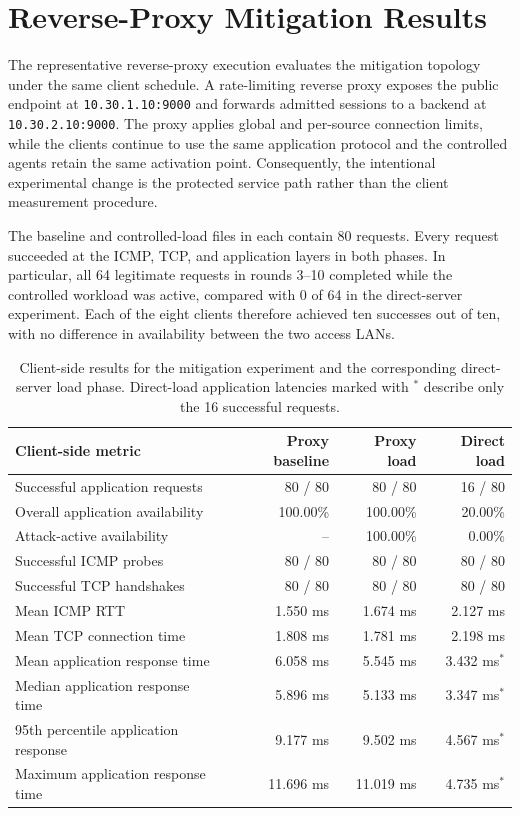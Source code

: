 \section{Reverse-Proxy Mitigation Results}
\label{sec:mitigation-results}

The representative reverse-proxy execution evaluates the mitigation topology
under the same client schedule. A rate-limiting reverse proxy exposes the public endpoint
at \texttt{10.30.1.10:9000} and forwards admitted sessions to a backend at
\texttt{10.30.2.10:9000}. The proxy applies global and per-source connection
limits, while the clients continue to use the same application protocol and
the controlled agents retain the same activation point. Consequently, the
intentional experimental change is the protected service path rather than the
client measurement procedure.

The baseline and controlled-load files in
 each contain 80 requests. Every request
succeeded at the ICMP, TCP, and application layers in both phases. In
particular, all 64 legitimate requests in rounds 3--10 completed while the
controlled workload was active, compared with 0 of 64 in the direct-server
experiment. Each of the eight clients therefore achieved ten successes out of
ten, with no difference in availability between the two access LANs.

\begin{table}[htbp]
\centering
\small
\setlength{\tabcolsep}{4pt}
\begin{tabular}{lrrr}
\toprule
\textbf{Client-side metric} & \textbf{Proxy baseline} & \textbf{Proxy load} & \textbf{Direct load} \\
\midrule
Successful application requests & 80 / 80 & 80 / 80 & 16 / 80 \\
Overall application availability & 100.00\% & 100.00\% & 20.00\% \\
Attack-active availability & -- & 100.00\% & 0.00\% \\
Successful ICMP probes & 80 / 80 & 80 / 80 & 80 / 80 \\
Successful TCP handshakes & 80 / 80 & 80 / 80 & 80 / 80 \\
Mean ICMP RTT & 1.550 ms & 1.674 ms & 2.127 ms \\
Mean TCP connection time & 1.808 ms & 1.781 ms & 2.198 ms \\
Mean application response time & 6.058 ms & 5.545 ms & 3.432 ms$^{*}$ \\
Median application response time & 5.896 ms & 5.133 ms & 3.347 ms$^{*}$ \\
95th percentile application response & 9.177 ms & 9.502 ms & 4.567 ms$^{*}$ \\
Maximum application response time & 11.696 ms & 11.019 ms & 4.735 ms$^{*}$ \\
\bottomrule
\end{tabular}
\caption{Client-side results for the mitigation experiment and the corresponding direct-server load phase. Direct-load application latencies marked with $^{*}$ describe only the 16 successful requests.}
\label{tab:mitigation-client-comparison}
\end{table}


